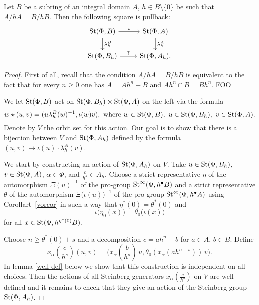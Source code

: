 \documentclass[oneside, 11pt]{amsart} \pdfoutput=1
\begin{document}
\begin{theorem}\label{glueing}
Let $B$ be a subring of an integral domain $A$, $h\in B \setminus \{0\}$ be such that $A / hA = B / hB$. Then the following square is pullback:
$$\begin{tikzcd}
\St(\Phi, B) \ar{r}{\iota} \ar{d}{\lambda_h^B} & \St(\Phi, A) \ar{d}{\lambda_h^A}\\
\St(\Phi, B_h) \ar{r}{\overline{\iota}} & \St(\Phi, A_h).
\end{tikzcd}$$
\end{theorem}
\begin{proof}

First of all, recall that the condition $A/hA = B/hB$ is equivalent to the fact that for every $n \geq 0$ one has $A = Ah^n + B$ and $Ah^n \cap B = Bh^n$. FOO

We let $\mathop{\mathrm{St}}\nolimits(\Phi, B)$ act on $\mathop{\mathrm{St}}\nolimits(\Phi, B_h) \times \mathop{\mathrm{St}}\nolimits(\Phi, A)$ on the left via the formula 
\[w \star (u, v) = (u \lambda_h^B(w)^{-1}, \iota(w) v),\text{ where }w \in \mathop{\mathrm{St}}\nolimits(\Phi, B),\ u \in \mathop{\mathrm{St}}\nolimits(\Phi, B_h),\ v \in \mathop{\mathrm{St}}\nolimits(\Phi, A).\]
Denote by $V$ the orbit set for this action. Our goal is to show that there is a bijection between $V$ and $\mathop{\mathrm{St}}\nolimits(\Phi, A_h)$ defined by the formula $(u, v) \mapsto \overline{\iota}(u) \cdot \lambda_h^A(v)$.

We start by constructing an action of $\mathop{\mathrm{St}}\nolimits(\Phi, A_h)$ on $V$.
Take $u \in \mathop{\mathrm{St}}\nolimits(\Phi, B_h)$, $v \in \mathop{\mathrm{St}}\nolimits(\Phi, A)$, $\alpha \in \Phi$, and $\frac c {h^s} \in A_h$. Choose a strict representative $\eta$ of the automorphism $\Xi(u)^{-1}$ of the pro-group $\mathop{\mathrm{St}}\nolimits^\infty(\Phi, h^\bullet B)$ and a strict representative $\theta$ of the automorphism $\Xi\bigl(\iota(u)\bigr)^{-1}$ of the pro-group $\mathop{\mathrm{St}}\nolimits^\infty(\Phi, h^\bullet A)$ using Corollart~\ref{vorcor} in such a way that $\eta^*(0) = \theta^*(0)$ and $$\iota\bigl(\eta_0(x)\bigr) = \theta_0\bigl(\iota(x)\bigr)$$ for all $x\in\mathop{\mathrm{St}}\nolimits(\Phi, h^{\eta^*(0)}B)$.

Choose $n \geq \theta^*(0) + s$ and a decomposition $c = ah^n + b$ for $a \in A$, $b \in B$. Define
$$\textstyle
x_\alpha(\frac c {h^s}) (u, v) = \bigl(x_\alpha(\frac b {h^s})\, u, \theta_0(x_\alpha(ah^{n - s}))\, v\bigr).
$$
In lemma \ref{well-def} below we show that this construction is independent on all choices. Then the actions of all Steinberg generators $x_\alpha(\frac c {h^s})$ on $V$ are well-defined and it remains to check that they give an action of the Steinberg group $\mathop{\mathrm{St}}\nolimits(\Phi, A_h)$.


\end{proof}
\end{document}
